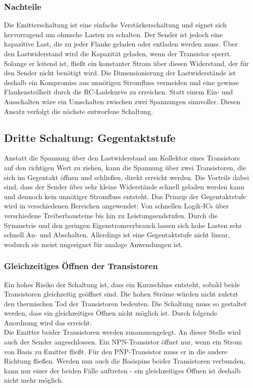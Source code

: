 \subsubsection{Nachteile}
Die Emitterschaltung ist eine einfache Verstärkerschaltung und eignet sich hervorragend um ohmsche Lasten zu schalten. Der Sender ist jedoch eine kapazitive Last, die zu jeder Flanke geladen oder entladen werden muss. Über den Lastwiderstand wird die Kapazität geladen, wenn der Transistor sperrt. Solange er leitend ist, fließt ein konstanter Strom über diesen Widerstand, der für den Sender nicht benötigt wird. Die Dimensionierung der Lastwiderstände ist deshalb ein Kompromiss aus unnötigen Stromfluss vermeiden und eine gewisse Flankensteilheit durch die RC-Ladekurve zu erreichen. Statt einem Ein- und Ausschalten wäre ein Umschalten zwischen zwei Spannungen sinnvoller. Diesen Ansatz verfolgt die nächste entworfene Schaltung.



\subsection{Dritte Schaltung: Gegentaktstufe}
Anstatt die Spannung über den Lastwiderstand am Kollektor eines Transistors auf den richtigen Wert zu ziehen, kann die Spannung über zwei Transistoren, die sich im Gegentakt öffnen und schließen, direkt erreicht werden. Die Vorteile dabei sind, dass der Sender über sehr kleine Widerstände schnell geladen werden kann und dennoch kein unnötiger Stromfluss entsteht. Das Prinzip der Gegentaktstufe wird in verschiedenen Bereichen angewendet: Von schnellen Logik-ICs über verschiedene Treiberbausteine bis hin zu Leistungsendstufen. Durch die Symmetrie und den geringen Eigenstromverbrauch lassen sich hohe Lasten sehr schnell An- und Abschalten. Allerdings ist eine Gegentaktstufe nicht linear, wodurch sie meist ungeeignet für analoge Anwendungen ist.


\subsubsection{Gleichzeitiges Öffnen der Transistoren}
Ein hohes Risiko der Schaltung ist, dass ein Kurzschluss entsteht, sobald beide Transistoren gleichzeitig geöffnet sind. Die hohen Ströme würden nicht zuletzt den thermischen Tod der Transistoren bedeuten. Die Schaltung muss so gestaltet werden, dass ein gleichzeitiges Öffnen nicht möglich ist. Durch folgende Anordnung wird das erreicht:\\
Die Emitter beider Transistoren werden zusammengelegt. An dieser Stelle wird auch der Sender angeschlossen. Ein NPN-Transistor öffnet nur, wenn ein Strom von Basis zu Emitter fließt. Für den PNP-Transistor muss er in die andere Richtung fließen. Werden nun auch die Basispins beider Transistoren verbunden, kann nur einer der beiden Fälle auftreten - ein gleichzeitiges Öffnen ist deshalb nicht mehr möglich. 

